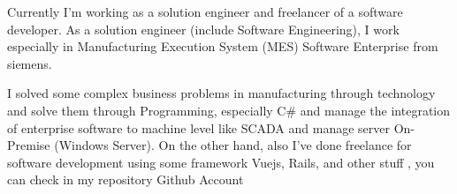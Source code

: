 

\begin{cvparagraph}

Currently I'm working as a solution engineer and freelancer of a software developer. As a solution engineer (include Software Engineering), I work especially in Manufacturing Execution System (MES) Software Enterprise from siemens.

I solved some complex business problems in manufacturing through technology and solve them through Programming, especially C\# and manage the integration of enterprise software to machine level like SCADA and manage server On-Premise (Windows Server). On the other hand, also I've done freelance for software development using some framework Vuejs, Rails, and other stuff , you can check in my repository Github Account
\end{cvparagraph}
